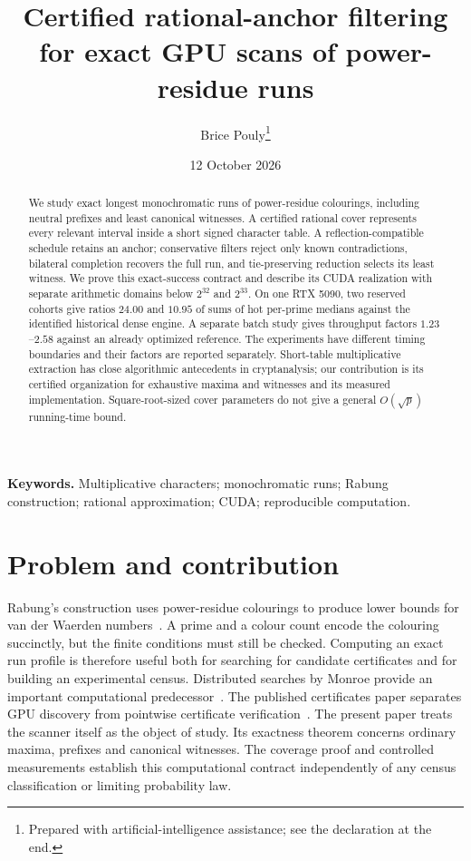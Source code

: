 \documentclass[11pt]{article}
\title{Certified rational-anchor filtering\\
for exact GPU scans of power-residue runs}
\author{Brice Pouly\thanks{Prepared with artificial-intelligence assistance; see the declaration at the end.}}
\date{12 October 2026}
\theoremstyle{definition}\newtheorem{remark}[theorem]{Remark}
\begin{document}
\maketitle
\begin{abstract}
We study exact longest monochromatic runs of power-residue colourings,
including neutral prefixes and least canonical witnesses. A certified
rational cover represents every relevant interval inside a short signed
character table. A reflection-compatible schedule retains an anchor;
conservative filters reject only known contradictions, bilateral completion
recovers the full run, and tie-preserving reduction selects its least
witness. We prove this exact-success contract and describe its CUDA
realization with separate arithmetic domains below $2^{32}$ and $2^{33}$.
On one RTX 5090, two reserved cohorts give ratios $24.00$ and $10.95$ of
sums of hot per-prime medians against the identified historical dense
engine. A separate batch study gives throughput factors $1.23$--$2.58$
against an already optimized reference. The experiments have different
timing boundaries and their factors are reported separately. Short-table
multiplicative extraction has close algorithmic antecedents in cryptanalysis;
our contribution is its certified organization for exhaustive maxima and
witnesses and its measured implementation. Square-root-sized cover
parameters do not give a general $O(\sqrt p)$ running-time bound.
\end{abstract}
\noindent\textbf{Keywords.} Multiplicative characters; monochromatic runs;
Rabung construction; rational approximation; CUDA; reproducible computation.

\section{Problem and contribution}
Rabung's construction uses power-residue colourings to produce lower bounds
for van der Waerden numbers~\cite{rabung}. A prime and a colour count encode
the colouring succinctly, but the finite conditions must still be checked.
Computing an exact run profile is therefore useful both for searching for
candidate certificates and for building an experimental census. Distributed
searches by Monroe provide an important computational predecessor~\cite{monroe,monroecode}.
The published certificates paper separates GPU discovery from
pointwise certificate verification~\cite{bounds,boundsv2}. The present paper treats
the scanner itself as the object of study. Its exactness theorem concerns
ordinary maxima, prefixes and canonical witnesses. The coverage proof and
controlled measurements establish this computational contract independently
of any census classification or limiting probability law.
\end{document}
